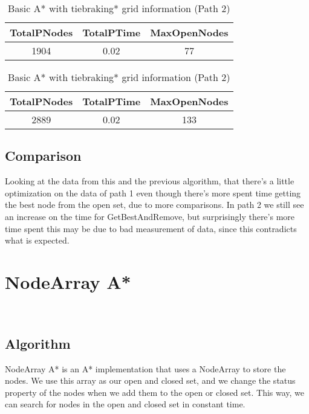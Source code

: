 \documentclass{article}
\begin{document}
  \begin{table}[h!]
    \parbox{.45\linewidth}{
        \centering
        \caption{Basic A* with tiebraking grid information (Path 1)}
        \label{tab:tableA*TiebrakingGrid1}
        \begin{tabular}{c|c|c}
          \textbf{TotalPNodes} & \textbf{TotalPTime} & \textbf{MaxOpenNodes}\\
          \hline
          1904 & 0.02 & 77\\
        \end{tabular}
    }
    \hfil
    \parbox{.45\linewidth}{
        \centering
        \caption{Basic A* with tiebraking* grid information (Path 2)}
        \label{tab:tableA*TiebrakingGrid2}
        \begin{tabular}{c|c|c}
          \textbf{TotalPNodes} & \textbf{TotalPTime} & \textbf{MaxOpenNodes}\\
          \hline
          2889 & 0.02 & 133\\
        \end{tabular}
    }
  \end{table}
  \subsection{Comparison}
  Looking at the data from this and the previous algorithm, that there's a little optimization on the data of path 1 even though there's more spent time getting
  the best node from the open set, due to more comparisons. In path 2 we still see an increase on the time for  GetBestAndRemove, but surprisingly there's more time spent
  this may be due to bad measurement of data, since this contradicts what is expected. \\
  
  \section{NodeArray A*}\
  \subsection{Algorithm}
  NodeArray A* is an A* implementation that uses a NodeArray to store the nodes. We use this array as our open and closed set, and we change the status property
  of the nodes when we add them to the open or closed set. This way, we can search for nodes in the open and closed set in constant time.\\
\end{document}
